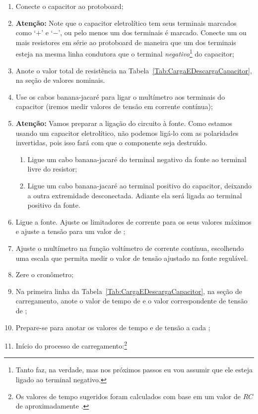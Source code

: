\begin{enumerate}
    \item Conecte o capacitor ao protoboard;
	\item \textbf{Atenção:} Note que o capacitor eletrolítico tem seus terminais marcados como `$+$' e `$-$', ou pelo menos um dos terminais é marcado. Conecte um ou mais resistores em série ao protoboard de maneira que um dos terminais esteja na mesma linha condutora que o terminal \emph{negativo}\footnote{Tanto faz, na verdade, mas nos próximos passos eu vou assumir que ele esteja ligado ao terminal negativo.} do capacitor;
	\item Anote o valor total de resistência na Tabela~\ref{Tab:CargaEDescargaCapacitor}, na seção de valores nominais.
	\item Use os cabos banana-jacaré para ligar o multímetro aos terminais do capacitor (iremos medir valores de tensão em corrente contínua);
	\item \textbf{Atenção:} Vamos preparar a ligação do circuito à fonte. Como estamos usando um capacitor eletrolítico, não podemos ligá-lo com as polaridades invertidas, pois isso fará com que o componente seja destruído.
	    \begin{enumerate}
	        \item Ligue um cabo banana-jacaré do terminal negativo da fonte ao terminal livre do resistor;
	        \item Ligue um cabo banana-jacaré ao terminal positivo do capacitor, deixando a outra extremidade desconectada. Adiante ela será ligada ao terminal positivo da fonte.
        \end{enumerate}
    \item Ligue a fonte. Ajuste os limitadores de corrente para os seus valores máximos e ajuste a tensão para um valor de ;
	\item Ajuste o multímetro na função voltímetro de corrente contínua, escolhendo uma escala que permita medir o valor de tensão ajustado na fonte regulável.
	\item Zere o cronômetro;
    \item Na primeira linha da Tabela~\ref{Tab:CargaEDescargaCapacitor}, na seção de carregamento, anote o valor de tempo de  e o valor correspondente de tensão de ; 
    \item Prepare-se para anotar os valores de tempo e de tensão a cada ;
	\item Início do processo de carregamento:\footnote{Os valores de tempo sugeridos foram calculados com base em um valor de $RC$ de aproximadamente .}

\end{enumerate}
